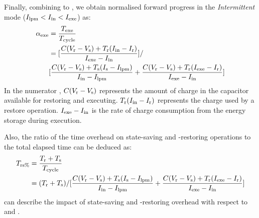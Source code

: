 Finally, combining  to , we obtain normalised forward progress  in the \textit{Intermittent} mode ($I_{\text{lpm}} < I_{\text{in}} < I_{\text{exe}}$) as:
\begin{equation}
    \begin{aligned}
        \alpha_{\text{exe}} &= \frac{T_{\text{exe}}}{T_{\text{cycle}}} \\
        &= [\frac{C (V_{\text{r}} - V_{\text{s}}) + T_{\text{r}} (I_{\text{in}} - I_{\text{r}})} {I_{\text{exe}} - I_{\text{in}}}] / \\
        &[\frac{C (V_{\text{r}} - V_{\text{s}}) + T_{\text{s}} (I_{\text{s}} - I_{\text{lpm}})}{I_{\text{in}} - I_{\text{lpm}}} + \frac{C (V_{\text{r}} - V_{\text{s}}) + T_{\text{r}} (I_{\text{exe}} - I_{\text{r}})}{I_{\text{exe}} - I_{\text{in}}}] \\
    \end{aligned}
    \label{eq:texepercent}
\end{equation}
In the numerator , $C(V_{\text{r}} - V_{\text{s}})$ represents the amount of charge in the capacitor available for restoring and executing. 
$T_{\text{r}} (I_{\text{in}} - I_{\text{r}})$ represents the charge used by a restore operation. 
$I_{\text{exe}} - I_{\text{in}}$ is the rate of charge consumption from the energy storage during execution.

Also, the ratio of the time overhead on state-saving and -restoring operations to the total elapsed time  can be deduced as:
\begin{equation}
    \begin{aligned}
        T_{\text{rs\%}} &= \frac{T_{\text{r}} + T_{\text{s}}}{T_{\text{cycle}}} \\
        &= (T_{\text{r}} + T_{\text{s}}) / [\frac{C (V_{\text{r}} - V_{\text{s}}) + T_{\text{s}} (I_{\text{s}} - I_{\text{lpm}})}{I_{\text{in}} - I_{\text{lpm}}} + \frac{C (V_{\text{r}} - V_{\text{s}}) + T_{\text{r}} (I_{\text{exe}} - I_{\text{r}})}{I_{\text{exe}} - I_{\text{in}}}]
    \end{aligned}
    \label{eq:trs}
\end{equation}
 can describe the impact of state-saving and -restoring overhead with respect to  and .


